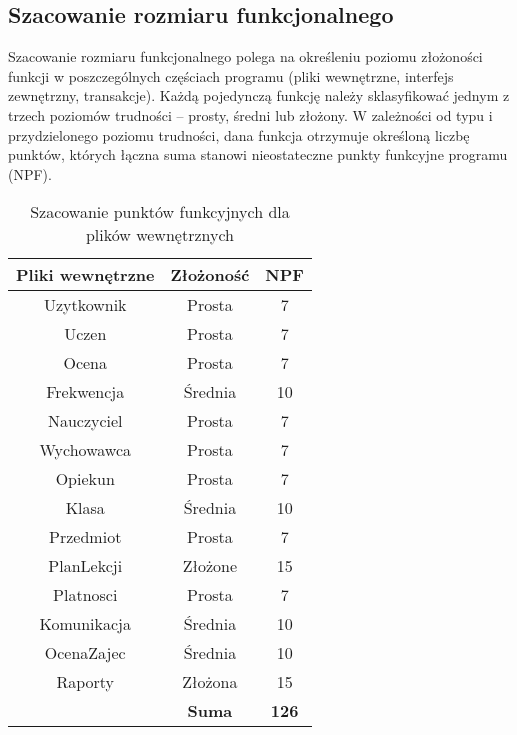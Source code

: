 \documentclass[12pt,leqno,twoside]{mwart}
\begin{document}
\subsection{Szacowanie rozmiaru funkcjonalnego}
\noindent Szacowanie rozmiaru funkcjonalnego polega na określeniu poziomu złożoności funkcji w poszczególnych częściach programu (pliki wewnętrzne, interfejs zewnętrzny, transakcje). Każdą pojedynczą funkcję należy sklasyfikować jednym z trzech poziomów trudności -- prosty, średni lub złożony. W zależności od typu i przydzielonego poziomu trudności, dana funkcja otrzymuje określoną liczbę punktów, których łączna suma stanowi nieostateczne punkty funkcyjne programu (NPF).
\begin{table}[h]
	\centering
	\caption{Szacowanie punktów funkcyjnych dla plików wewnętrznych}
		\rule{0pt}{3ex}
		\begin{tabular}{c|c|c|}
		\hline
		\multicolumn{1}{|c|}{\textbf{Pliki wewnętrzne}} & \textbf{Złożoność} & \textbf{NPF} \\ \hline
		\multicolumn{1}{|c|}{Uzytkownik} 	& Prosta 	& 7 \\ \hline
		\multicolumn{1}{|c|}{Uczen} 		& Prosta 	& 7 \\ \hline
		\multicolumn{1}{|c|}{Ocena} 		& Prosta 	& 7 \\ \hline
		\multicolumn{1}{|c|}{Frekwencja} 	& Średnia 	& 10 \\ \hline
		\multicolumn{1}{|c|}{Nauczyciel} 	& Prosta 	& 7 \\ \hline
		\multicolumn{1}{|c|}{Wychowawca} 	& Prosta 	& 7 \\ \hline
		\multicolumn{1}{|c|}{Opiekun} 		& Prosta 	& 7 \\ \hline
		\multicolumn{1}{|c|}{Klasa} 		& Średnia 	& 10 \\ \hline
		\multicolumn{1}{|c|}{Przedmiot} 	& Prosta 	& 7 \\ \hline
		\multicolumn{1}{|c|}{PlanLekcji} 	& Złożone 	& 15 \\ \hline
		\multicolumn{1}{|c|}{Platnosci} 	& Prosta 	& 7 \\ \hline
		\multicolumn{1}{|c|}{Komunikacja} & Średnia 	& 10 \\ \hline
		\multicolumn{1}{|c|}{OcenaZajec} 	& Średnia 	& 10 \\ \hline
		\multicolumn{1}{|c|}{Raporty} 	& Złożona 	& 15 \\ \hline
					& \textbf{Suma}	& \textbf{126} \\ \cline{2-3}
		\end{tabular}
	\label{pkt_fun_struktury}
\end{table}
\end{document}
